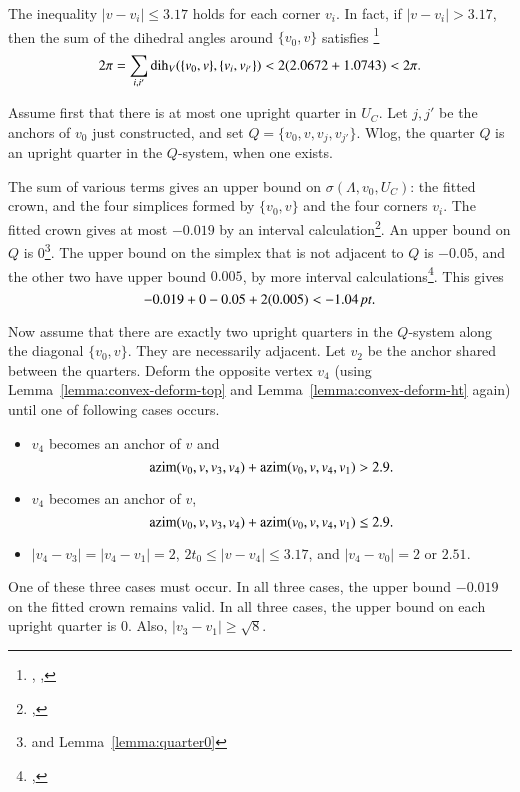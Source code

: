 \begin{proved}
The inequality $|v-v_i|\le 3.17$ holds for each corner $v_i$.
In fact, if $|v-v_i| > 3.17$,
then the sum of the dihedral angles around $\{v_0,v\}$ satisfies%
\footnote{, , }  
 $$
 2\pi = \sum_{i,i'} \operatorname{dih}_V(\{v_0,v\},\{v_i,v_{i'}\}) < 2(2.0672+1.0743) < 2\pi.
 $$

Assume first that there is at most one upright quarter in $U_C$.
Let $j,j'$ be the anchors of $v_0$ just constructed, and set
$Q = \{v_0,v,v_j,v_{j'}\}$.  Wlog, the quarter $Q$ is an upright
quarter in the $Q$-system, when one exists.

The sum of various terms gives an upper bound on $\sigma(\Lambda,v_0,U_C)$: the fitted
crown, and the four simplices formed by $\{v_0,v\}$ and the four
corners $v_i$.  The fitted crown gives at most $-0.019$
by an interval calculation\footnote{, }.
An upper bound on $Q$ is $0$\footnote{ and Lemma~\ref{lemma:quarter0}}.
The upper bound on the simplex that is not adjacent to $Q$ is $-0.05$,
and the other two have upper bound $0.005$, by more interval calculations\footnote{, }.  This gives
$$
  -0.019 + 0  - 0.05 +  2 (0.005) < -1.04\,\hbox{\it pt}.
$$

Now assume that there are exactly two upright quarters in the
$Q$-system along the
diagonal $\{v_0,v\}$.  They
are necessarily adjacent.  Let $v_2$ be the anchor shared between the
quarters.  Deform the opposite vertex $v_4$ (using Lemma~\ref{lemma:convex-deform-top} and Lemma~\ref{lemma:convex-deform-ht} again)  
until one of following cases occurs.
\begin{itemize}
\item $v_4$ becomes an anchor of $v$ and
  $$
  {\operatorname{azim}}(v_0,v,v_3,v_4) + {\operatorname{azim}}(v_0,v,v_4,v_1) > 2.9.
  $$
\item  $v_4$ becomes an anchor of $v$,
  $$
  {\operatorname{azim}}(v_0,v,v_3,v_4) + {\operatorname{azim}}(v_0,v,v_4,v_1)\le 2.9.
  $$
\item $|v_4-v_3|=|v_4-v_1|=2$, $2t_0 \le |v-v_4| \le 3.17$, 
and $|v_4-v_0|=2$ or $2.51$.
\end{itemize}
One of these three cases must occur.  In all three cases,
the upper bound $-0.019$ on the fitted crown remains valid.
In all three cases, the upper bound on each upright quarter is $0$.
Also,  $|v_3-v_1|\ge \sqrt8$.


\end{proved}
